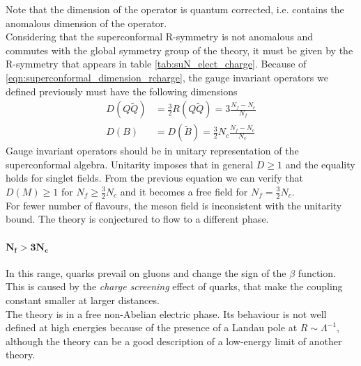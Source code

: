 Note that the dimension of the operator is quantum corrected, i.e. contains the anomalous dimension of the operator.
\\
Considering that the superconformal R-symmetry is not anomalous and commutes with the global symmetry group of the theory, it must be given by the R-symmetry that appears in table \ref{tab:suN_elect_charge}.
Because of \eqref{eqn:superconformal_dimension_rcharge}, the gauge invariant operators we defined previously must have the following dimensions
\begin{align}
 D(Q \tilde{Q}) &= \frac{3}{2} R(Q \tilde{Q}) = 3 \frac{N_f - N_c}{N_f}\\
 D(B) & = D(\tilde{B})  = \frac{3}{2} N_c \frac{N_f - N_c}{N_c}
\end{align}
Gauge invariant operators should be in unitary representation of the superconformal algebra.
Unitarity imposes that in general $D\geq 1$ and the equality holds for singlet fields.
From the previous equation we can verify that $D(M) \geq 1$ for $ N_f \geq \frac{3}{2}N_c$ and it becomes a free field for $N_f = \frac{3}{2}N_c$. 
\\
For fewer number of flavours, the meson field is inconsistent with the unitarity bound.
The theory is conjectured to flow to a different phase.
\paragraph{$\mathbf{ N_f > 3 N_c}$}
In this range, quarks prevail on gluons and change the sign of the $\beta$ function. 
This is caused by the \emph{charge screening} effect of quarks, that make the coupling constant smaller at larger distances.\\
The theory is in a free non-Abelian electric phase.
Its behaviour is not well defined at high energies because of the presence of a Landau pole at $R \sim \Lambda^{-1}$, although the theory can be a good description of a low-energy limit of another theory. 



















